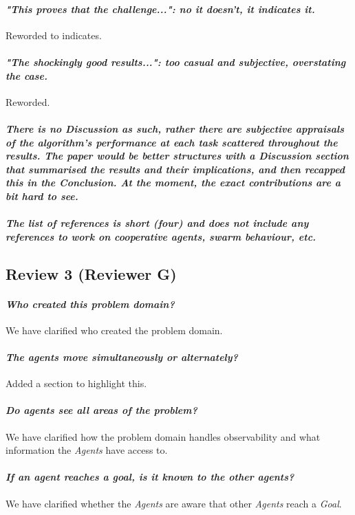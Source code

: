 \documentclass{article}
\begin{document}
\paragraph*{\textit{"This proves that the challenge...": no it doesn't, it indicates it.}}
Reworded to indicates.
\paragraph*{\textit{"The shockingly good results...": too casual and subjective, overstating the case.}}
Reworded. 
\paragraph*{\textit{There is no Discussion as such, rather there are subjective appraisals of the algorithm's performance at each task scattered throughout the results. The paper would be better structures with a Discussion section that summarised the results and their implications, and then recapped this in the Conclusion. At the moment, the exact contributions are a bit hard to see.}}
\paragraph*{\textit{The list of references is short (four) and does not include any references to work on cooperative agents, swarm behaviour, etc.}}
\subsection{Review 3 (Reviewer G)}
\paragraph*{\textit{Who created this problem domain?}}
We have clarified who created the problem domain.
\paragraph*{\textit{The agents move simultaneously or alternately?}}
Added a section to highlight this.
\paragraph*{\textit{Do agents see all areas of the problem?}}
We have clarified how the problem domain handles observability and what information the \emph{Agents} have access to.
\paragraph*{\textit{If an agent reaches a goal, is it known to the other agents?}}
We have clarified whether the \emph{Agents} are aware that other \emph{Agents} reach a \emph{Goal}.
\end{document}
